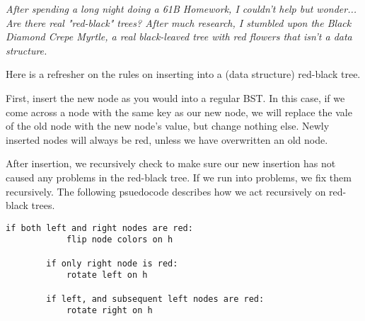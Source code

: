\emph{After spending a long night doing a 61B Homework, I couldn't help but wonder... Are there real "red-black" trees? After much research, I stumbled upon the Black Diamond Crepe Myrtle, a real black-leaved tree with red flowers that isn't a data structure. 
} \\

\n

Here is a refresher on the rules on inserting into a (data structure) red-black tree. 

First, insert the new node as you would into a regular BST. In this case, if we come across a node with the same key as our new node, we will replace the vale of the old node with the new node's value, but change nothing else. Newly inserted nodes will always be red, unless we have overwritten an old node.

After insertion, we recursively check to make sure our new insertion has not caused any problems in the red-black tree. If we run into problems, we fix them recursively. The following psuedocode describes how we act recursively on red-black trees.
\begin{lstlisting}
if both left and right nodes are red: 
            flip node colors on h 
            
        if only right node is red: 
            rotate left on h 
        
        if left, and subsequent left nodes are red: 
            rotate right on h 
\end{lstlisting}



